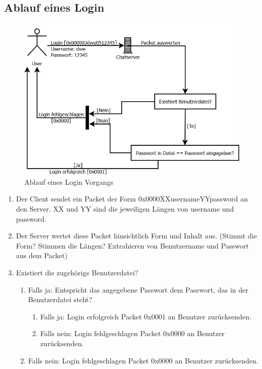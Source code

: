 \documentclass[a4paper,12pt]{scrartcl}
\begin{document}
\subsection{Ablauf eines Login}
\begin{figure}[h]
	\centering
	\includegraphics[width=14cm]{Bilder/Ablauf_Login.png}
	\caption{Ablauf eines Login Vorgangs}
\end{figure}
\begin{enumerate}[label*=\arabic*.]
\item Der Client sendet ein Packet der Form 0x0000XXusernameYYpassword an den Server. XX und YY sind die jeweiligen Längen von username und password.
\item Der Server wertet diese Packet hinsichtlich Form und Inhalt aus. (Stimmt die Form? Stimmen die Längen? Extrahieren von Benutzername und Passwort aus dem Packet)
\item Existiert die zugehörige Benutzerdatei?
\begin{enumerate}[label*=\arabic*.]
      \item Falls ja: Entspricht das angegebene Passwort dem Passwort, das in der Benutzerdatei steht?
      \begin{enumerate}[label*=\arabic*.]
           \item Falls ja: Login erfolgreich Packet 0x0001 an Benutzer zurücksenden.
           \item Falls nein: Login fehlgeschlagen Packet 0x0000 an Benutzer zurücksenden.
\end{enumerate}
      \item Falls nein: Login fehlgeschlagen Packet 0x0000 an Benutzer zurücksenden.
\end{enumerate}
\end{enumerate}
\clearpage
\end{document}

